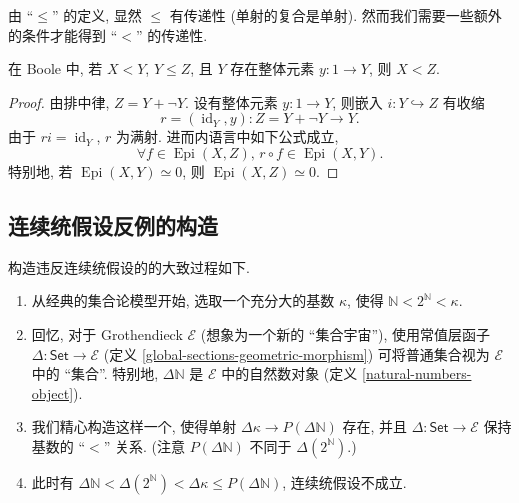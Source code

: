 由 ``$\leq$'' 的定义, 显然 $\leq$ 有传递性 (单射的复合是单射). 然而我们需要一些额外的条件才能得到 ``$<$'' 的传递性.
\begin{prop}
	{}
	在 Boole \topos{}中, 若 $X<Y$, $Y\leq Z$, 且 $Y$ 存在整体元素 $y\colon 1\to Y$, 则 $X<Z$.
\end{prop}
\begin{proof}
	由排中律, $Z=Y+\neg Y$. 设有整体元素 $y\colon 1\to Y$, 则嵌入 $i\colon Y\hookrightarrow Z$ 有收缩 $$r=(\operatorname{id}_Y,y)\colon Z=Y+\neg Y\to Y.$$
	由于 $ri=\operatorname{id}_Y$, $r$ 为满射. 进而内语言中如下公式成立,
	$$
	\forall f\in\operatorname{Epi}(X,Z),\,r\circ f\in\operatorname{Epi}(X,Y).
	$$
	特别地, 若 $\operatorname{Epi}(X,Y)\simeq 0$, 则 $\operatorname{Epi}(X,Z)\simeq 0$.
\end{proof}

\subsection{连续统假设反例的构造}


构造违反连续统假设的\topos{}的大致过程如下.
\begin{enumerate}[(1)]
	\item 从经典的集合论模型开始, 选取一个充分大的基数 $\kappa$, 使得 $\mathbb{N}< 2^{\mathbb{N}} <\kappa$. %
	\item 回忆, 对于 Grothendieck \topos{} $\mathcal E$ (想象为一个新的 ``集合宇宙''), 使用常值层函子 $\Delta\colon\mathsf{Set}\to \mathcal E$ (定义 \ref{global-sections-geometric-morphism}) 可将普通集合视为 $\mathcal E$ 中的 ``集合''. 特别地, $\Delta\mathbb{N}$ 是 $\mathcal E$ 中的自然数对象 (定义 \ref{natural-numbers-object}).
	\item \label{Cohen-topos-essence}我们精心构造这样一个\topos{}, 使得单射 $\Delta\kappa\to P(\Delta\mathbb{N})$ 存在, 并且 $\Delta\colon\mathsf{Set}\to\mathcal{E}$ 保持基数的 ``$<$'' 关系. (注意 $P(\Delta\mathbb N)$ 不同于 $\Delta(2^\mathbb{N})$.)
	\item 此时有 $\Delta\mathbb{N} <\Delta(2^\mathbb{N})<\Delta\kappa \leq P (\Delta\mathbb{N})$, 连续统假设不成立.
\end{enumerate}


